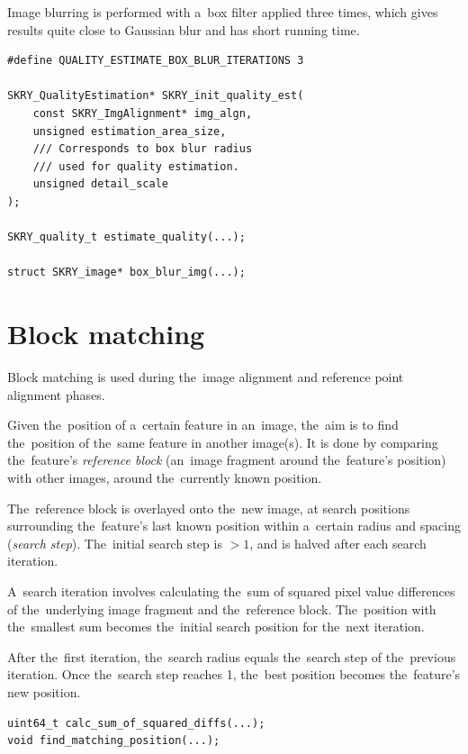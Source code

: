 \documentclass[12pt]{article}
\begin{document}
Image blurring is performed with a~box filter applied three times, which gives results quite close to Gaussian blur and
has short running time.

\begin{lstlisting}[caption={Image quality ({\ttfamily{filters.h/.c, quality.h/.c}})}]
#define QUALITY_ESTIMATE_BOX_BLUR_ITERATIONS 3

SKRY_QualityEstimation* SKRY_init_quality_est(
    const SKRY_ImgAlignment* img_algn,
    unsigned estimation_area_size,
    /// Corresponds to box blur radius
    /// used for quality estimation.
    unsigned detail_scale
);

SKRY_quality_t estimate_quality(...);

struct SKRY_image* box_blur_img(...);
\end{lstlisting}

\section{Block matching}\label{sec:blockmatching}

Block matching is used during the~image alignment and reference point alignment phases.

Given the~position of a~certain feature in an~image, the~aim is to find the~position of the~same feature in another
image(s). It is done by comparing the~feature's \emph{reference block} (an~image fragment around the~feature's position)
with other images, around the~currently known position.

The~reference block is overlayed onto the~new image, at search positions surrounding the~feature's last known position
within a~certain radius and spacing (\emph{search step}). The~initial search step is $>1$, and is halved after each
search iteration.

A~search iteration involves calculating the~sum of squared pixel value differences of the~underlying image fragment and
the~reference block. The~position with the~smallest sum becomes the~initial search position for the~next iteration.

After the~first iteration, the~search radius equals the~search step of the~previous iteration. Once the~search step
reaches 1, the~best position becomes the~feature's new position.

\begin{lstlisting}[caption={Block matching ({\ttfamily{match.h/.c}})}]
uint64_t calc_sum_of_squared_diffs(...);
void find_matching_position(...);
\end{lstlisting}
\end{document}
